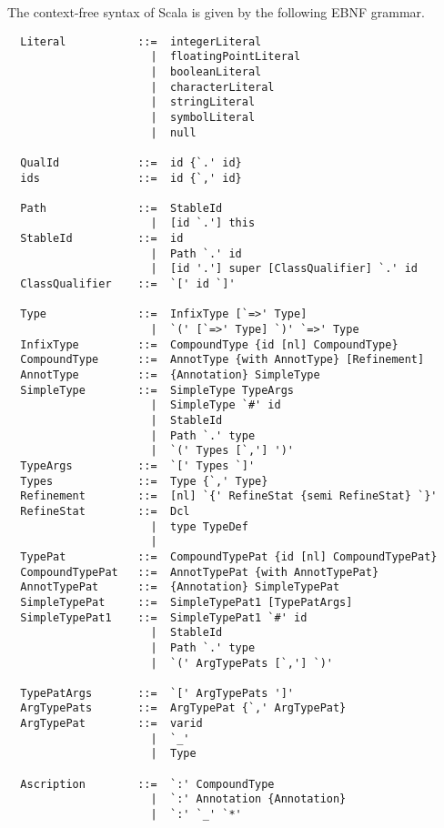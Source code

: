 The context-free syntax of Scala is given by the following EBNF
grammar.

{\small
\begin{lstlisting}
  Literal           ::=  integerLiteral
                      |  floatingPointLiteral
                      |  booleanLiteral
                      |  characterLiteral
                      |  stringLiteral
                      |  symbolLiteral
                      |  null

  QualId            ::=  id {`.' id}
  ids               ::=  id {`,' id}

  Path              ::=  StableId
                      |  [id `.'] this
  StableId          ::=  id
                      |  Path `.' id
                      |  [id '.'] super [ClassQualifier] `.' id
  ClassQualifier    ::=  `[' id `]'

  Type              ::=  InfixType [`=>' Type]
                      |  `(' [`=>' Type] `)' `=>' Type
  InfixType         ::=  CompoundType {id [nl] CompoundType}
  CompoundType      ::=  AnnotType {with AnnotType} [Refinement]
  AnnotType         ::=  {Annotation} SimpleType
  SimpleType        ::=  SimpleType TypeArgs
                      |  SimpleType `#' id
                      |  StableId
                      |  Path `.' type
                      |  `(' Types [`,'] ')'
  TypeArgs          ::=  `[' Types `]'
  Types             ::=  Type {`,' Type}
  Refinement        ::=  [nl] `{' RefineStat {semi RefineStat} `}'
  RefineStat        ::=  Dcl
                      |  type TypeDef
                      |
  TypePat           ::=  CompoundTypePat {id [nl] CompoundTypePat}
  CompoundTypePat   ::=  AnnotTypePat {with AnnotTypePat}
  AnnotTypePat      ::=  {Annotation} SimpleTypePat
  SimpleTypePat     ::=  SimpleTypePat1 [TypePatArgs]
  SimpleTypePat1    ::=  SimpleTypePat1 `#' id
                      |  StableId 
                      |  Path `.' type
                      |  `(' ArgTypePats [`,'] `)'
 
  TypePatArgs       ::=  `[' ArgTypePats ']'
  ArgTypePats       ::=  ArgTypePat {`,' ArgTypePat}
  ArgTypePat        ::=  varid 
                      |  `_' 
                      |  Type

  Ascription        ::=  `:' CompoundType
                      |  `:' Annotation {Annotation} 
                      |  `:' `_' `*'


\end{lstlisting}}
